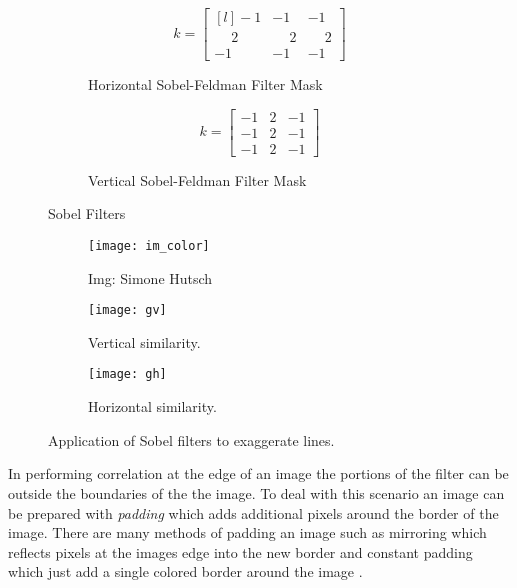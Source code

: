 \begin{figure}[H]
  \begin{subfigure}[b]{0.49\textwidth}
    \[k =
    \begin{bmatrix*}[l]
     -1 & -1 & -1 \\
      \phantom{-}2 & \phantom{-}2 & \phantom{-}2 \\
      -1 & -1 & -1 
    \end{bmatrix*}
    \]
    \caption{Horizontal Sobel-Feldman Filter Mask}
    \label{rfidtest_xaxis}
\end{subfigure}
\begin{subfigure}[b]{0.49\textwidth}
  \[ k = 
    \begin{bmatrix}
      -1 & 2 & -1 \\
      -1 & 2 & -1 \\
      -1 & 2 & -1
    \end{bmatrix}
    \]
    \caption{Vertical Sobel-Feldman Filter Mask}  
\end{subfigure}
    \caption{Sobel Filters}
    \label{fig:sobel_filters}
\end{figure}

\begin{figure}[H]
  \centering
  \begin{subfigure}[b]{0.3\textwidth}
      \texttt{[image: im\_color]}
      \caption{Img: Simone Hutsch}
  \end{subfigure}
  \begin{subfigure}[b]{0.3\textwidth}
      \texttt{[image: gv]}
      \caption{Vertical similarity.}
      \label{fig:vert}
  \end{subfigure}
  \begin{subfigure}[b]{0.3\textwidth}
      \texttt{[image: gh]}
      \caption{Horizontal similarity.}
      \label{fig:hoz}
  \end{subfigure}
  \caption{Application of Sobel filters to exaggerate lines.}
  \label{fig:sobel_apply}
\end{figure}

In performing correlation at the edge of an image the portions of the filter can be outside the boundaries of the the image. To deal with this scenario an image can be prepared with \emph{padding} which adds additional pixels around the border of the image. There are many methods of padding an image such as mirroring which reflects pixels at the images edge into the new border and constant padding which just add a single colored border around the image \cite{realtimerendering}.


